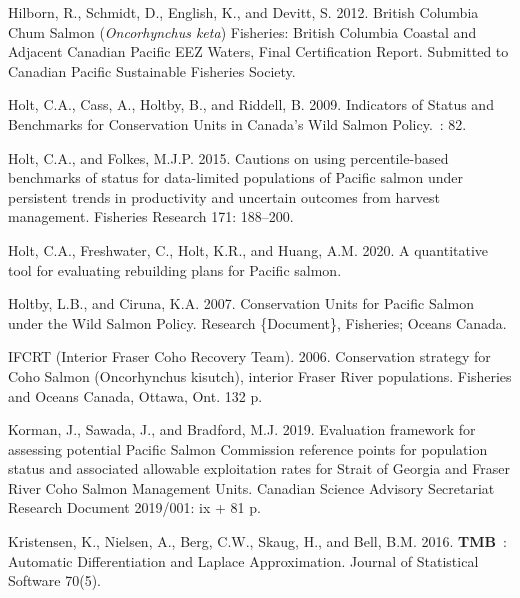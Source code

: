 \documentclass[11pt]{book}
\begin{document}
\begin{CSLReferences}{1}{0}
%
Hilborn, R., Schmidt, D., English, K., and Devitt, S. 2012. British {Columbia} {Chum} {Salmon} (\emph{{Oncorhynchus} keta}) {Fisheries}: {British} {Columbia} {Coastal} and {Adjacent} {Canadian} {Pacific} {EEZ} {Waters}, {Final} {Certification} {Report}. Submitted to Canadian Pacific Sustainable Fisheries Society.

%
Holt, C.A., Cass, A., Holtby, B., and Riddell, B. 2009. Indicators of {Status} and {Benchmarks} for {Conservation} {Units} in {Canada}'s {Wild} {Salmon} {Policy}.~: 82.

%
Holt, C.A., and Folkes, M.J.P. 2015. Cautions on using percentile-based benchmarks of status for data-limited populations of {Pacific} salmon under persistent trends in productivity and uncertain outcomes from harvest management. Fisheries Research 171: 188--200.

%
Holt, C.A., Freshwater, C., Holt, K.R., and Huang, A.M. 2020. A quantitative tool for evaluating rebuilding plans for {Pacific} salmon.

%
Holtby, L.B., and Ciruna, K.A. 2007. Conservation {Units} for {Pacific} {Salmon} under the {Wild} {Salmon} {Policy}. Research \{Document\}, Fisheries; Oceans Canada.

%
IFCRT (Interior Fraser Coho Recovery Team). 2006. Conservation strategy for {Coho} {Salmon} ({Oncorhynchus} kisutch), interior {Fraser} {River} populations. {Fisheries} and {Oceans} {Canada}, {Ottawa}, {Ont}. 132 p.

%
Korman, J., Sawada, J., and Bradford, M.J. 2019. Evaluation framework for assessing potential {Pacific} {Salmon} {Commission} reference points for population status and associated allowable exploitation rates for {Strait} of {Georgia} and {Fraser} {River} {Coho} {Salmon} {Management} {Units}. Canadian Science Advisory Secretariat Research Document 2019/001: ix + 81 p.

%
Kristensen, K., Nielsen, A., Berg, C.W., Skaug, H., and Bell, B.M. 2016. \textbf{TMB}~: {Automatic} {Differentiation} and {Laplace} {Approximation}. Journal of Statistical Software 70(5).


\end{CSLReferences}
\end{document}
